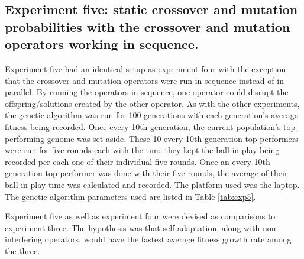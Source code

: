 \documentclass[a4paper,10pt]{article}
\begin{document}
\subsection{Experiment five: static crossover and mutation probabilities with the crossover and mutation operators working in sequence.}

Experiment five had an identical setup as experiment four with the exception that the crossover and mutation operators were run in sequence instead of in parallel. By running the operators in sequence, one operator could disrupt the offspring/solutions created by the other operator. As with the other experiments, the genetic algorithm was run for 100 generations with each generation's average fitness being recorded. Once every 10th generation, the current population's top performing genome was set aside. These 10 every-10th-generation-top-performers were run for five rounds each with the time they kept the ball-in-play being recorded per each one of their individual five rounds. Once an every-10th-generation-top-performer was done with their five rounds, the average of their ball-in-play time was calculated and recorded. The platform used was the laptop. The genetic algorithm parameters used are listed in Table \ref{tab:exp5}.

Experiment five as well as experiment four were devised as comparisons to experiment three. The hypothesis was that self-adaptation, along with non-interfering operators, would have the fastest average fitness growth rate among the three.
\end{document}
